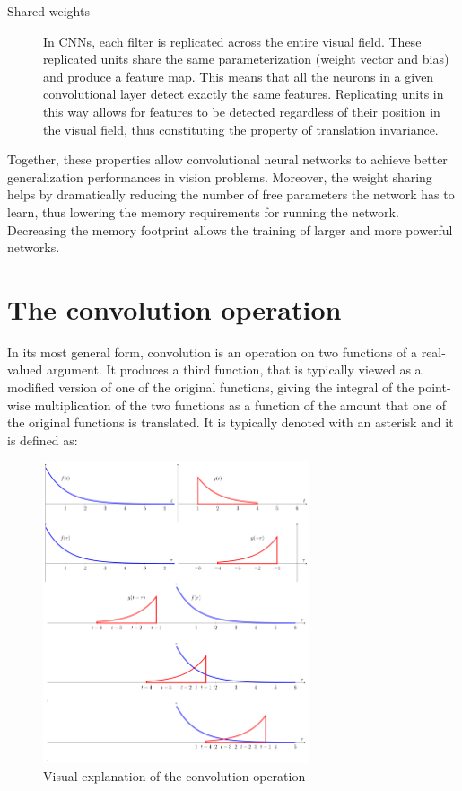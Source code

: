 \begin{description}
	\item[Shared weights] In \acsp{CNN}, each filter is replicated across the entire visual field. These replicated units share the same parameterization (weight vector and bias) and produce a feature map. This means that all the neurons in a given convolutional layer detect exactly the same features. Replicating units in this way allows for features to be detected regardless of their position in the visual field, thus constituting the property of translation invariance.
	
\end{description}

Together, these properties allow convolutional neural networks to achieve better generalization performances in vision problems. Moreover, the weight sharing helps by dramatically reducing the number of free parameters the network has to learn, thus lowering the memory requirements for running the network. Decreasing the memory footprint allows the training of larger and more powerful networks.

\section{The convolution operation}

In its most general form, convolution is an operation on two functions of a real-valued argument. It produces a third function, that is typically viewed as a modified version of one of the original functions, giving the integral of the point-wise multiplication of the two functions as a function of the amount that one of the original functions is translated. It is typically
denoted with an asterisk and it is defined as:

\begin{figure}[t]
	\centering
	\includegraphics[width=0.7\textwidth]{Images/convolution}
	\caption{Visual explanation of the convolution operation}\label{fig:convolution}
\end{figure}


